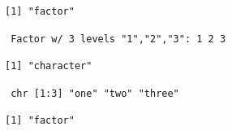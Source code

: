 \begin{verbatim}
[1] "factor"
\end{verbatim}

\begin{Shaded}
\begin{Highlighting}[]
\end{Highlighting}
\end{Shaded}

\begin{verbatim}
 Factor w/ 3 levels "1","2","3": 1 2 3
\end{verbatim}

\begin{Shaded}
\begin{Highlighting}[]
\StringTok{ }\NormalTok{(}\NormalTok{,}\NormalTok{,}\NormalTok{)}
\end{Highlighting}
\end{Shaded}

\begin{verbatim}
[1] "character"
\end{verbatim}

\begin{Shaded}
\begin{Highlighting}[]
\end{Highlighting}
\end{Shaded}

\begin{verbatim}
 chr [1:3] "one" "two" "three"
\end{verbatim}

\begin{Shaded}
\begin{Highlighting}[]
\StringTok{ }
\end{Highlighting}
\end{Shaded}

\begin{verbatim}
[1] "factor"
\end{verbatim}

\begin{Shaded}
\begin{Highlighting}[]
\end{Highlighting}
\end{Shaded}


